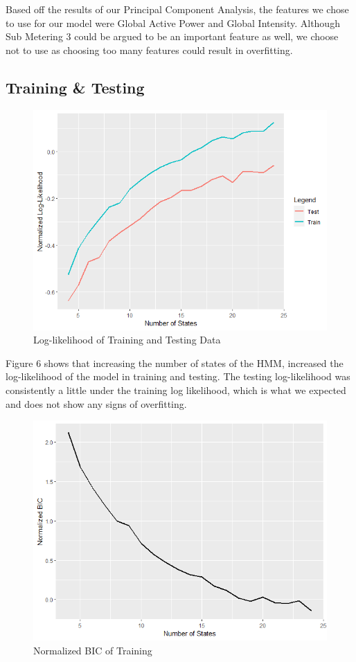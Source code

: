 \documentclass[11pt]{article}
\begin{document}
Based off the results of our Principal Component Analysis, the features we chose 
to use for our model were Global Active Power and Global Intensity.
Although Sub Metering 3 could be argued to be an important feature as well, we 
choose not to use as choosing too many features could result in overfitting.

\subsection{Training \& Testing} 

\begin{figure}[H]
  \centering
  \includegraphics[scale=0.7]{../images/TrainTest.png}
  \caption{Log-likelihood of Training and Testing Data}
\end{figure}

Figure 6 shows that increasing the number of states of the HMM, increased the 
log-likelihood of the model in training and testing. 
The testing log-likelihood was consistently a little under the training log 
likelihood, which is what we expected and does not show any signs of overfitting.

\begin{figure}[H]
  \centering
  \includegraphics[scale=0.7]{../images/ModelBIC.png}
  \caption{Normalized BIC of Training}
\end{figure}
\end{document}
